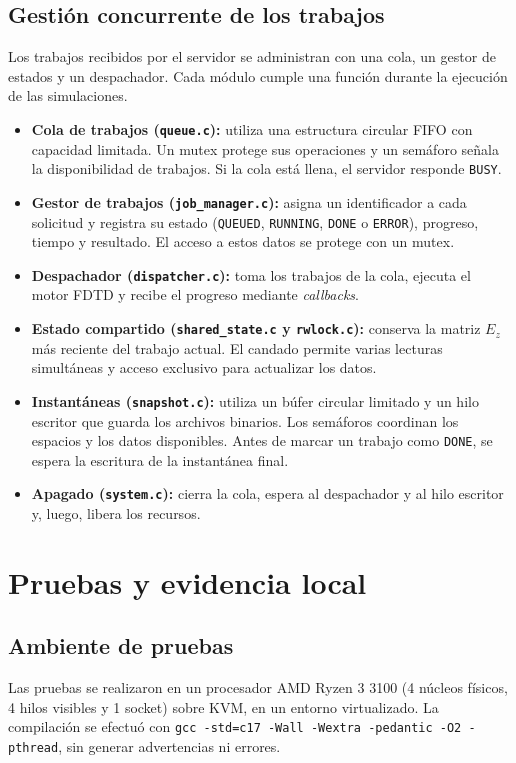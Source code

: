 \documentclass[12pt,a4paper]{article}
\begin{document}
\subsection{Gestión concurrente de los trabajos}
Los trabajos recibidos por el servidor se administran con una cola, un gestor de estados y un despachador. Cada módulo cumple una función durante la ejecución de las simulaciones.
\begin{itemize}
\item \textbf{Cola de trabajos (\texttt{queue.c}):} utiliza una estructura circular FIFO con capacidad limitada. Un mutex protege sus operaciones y un semáforo señala la disponibilidad de trabajos. Si la cola está llena, el servidor responde \texttt{BUSY}.
\item \textbf{Gestor de trabajos (\texttt{job\_manager.c}):} asigna un identificador a cada solicitud y registra su estado (\texttt{QUEUED}, \texttt{RUNNING}, \texttt{DONE} o \texttt{ERROR}), progreso, tiempo y resultado. El acceso a estos datos se protege con un mutex.
\item \textbf{Despachador (\texttt{dispatcher.c}):} toma los trabajos de la cola, ejecuta el motor FDTD y recibe el progreso mediante \textit{callbacks}.
\item \textbf{Estado compartido (\texttt{shared\_state.c} y \texttt{rwlock.c}):} conserva la matriz $E_z$ más reciente del trabajo actual. El candado permite varias lecturas simultáneas y acceso exclusivo para actualizar los datos.
\item \textbf{Instantáneas (\texttt{snapshot.c}):} utiliza un búfer circular limitado y un hilo escritor que guarda los archivos binarios. Los semáforos coordinan los espacios y los datos disponibles. Antes de marcar un trabajo como \texttt{DONE}, se espera la escritura de la instantánea final.
\item \textbf{Apagado (\texttt{system.c}):} cierra la cola, espera al despachador y al hilo escritor y, luego, libera los recursos.
\end{itemize}

\section{Pruebas y evidencia local}
\subsection{Ambiente de pruebas}
Las pruebas se realizaron en un procesador AMD Ryzen 3 3100 (4 núcleos físicos, 4 hilos visibles y 1 socket) sobre KVM, en un entorno virtualizado. La compilación se efectuó con \texttt{gcc -std=c17 -Wall -Wextra -pedantic -O2 -pthread}, sin generar advertencias ni errores.
\end{document}
